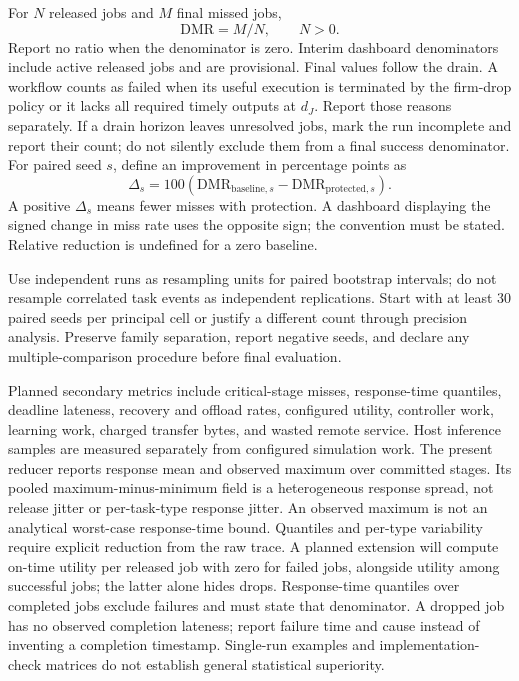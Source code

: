\documentclass[11pt,a4paper]{article}
\begin{document}
For $N$ released jobs and $M$ final missed jobs,
\begin{equation}
 \mathrm{DMR}=M/N,\qquad N>0.
\end{equation}
Report no ratio when the denominator is zero. Interim dashboard denominators
include active released jobs and are provisional. Final values follow the drain. A workflow counts as failed when its useful
execution is terminated by the firm-drop policy or it lacks all required timely
outputs at $d_J$. Report those reasons separately. If a drain horizon leaves
unresolved jobs, mark the run incomplete and report their count; do not silently
exclude them from a final success denominator.
For paired seed $s$, define an improvement in percentage points as
\begin{equation}
 \Delta_s=100(\mathrm{DMR}_{\mathrm{baseline},s}
                  -\mathrm{DMR}_{\mathrm{protected},s}).
\end{equation}
A positive $\Delta_s$ means fewer misses with protection. A dashboard displaying
the signed change in miss rate uses the opposite sign; the convention must be
stated. Relative reduction is undefined for a zero baseline.

Use independent runs as resampling units for paired bootstrap intervals; do
not resample correlated task events as independent replications. Start with at
least 30 paired seeds per principal cell or justify a different count through
precision analysis. Preserve family separation, report negative seeds, and
declare any multiple-comparison procedure before final evaluation.

Planned secondary metrics include critical-stage misses, response-time quantiles,
deadline lateness, recovery and offload rates, configured utility, controller
work, learning work, charged transfer bytes, and wasted remote service. Host
inference samples are measured separately from configured simulation work.
The present reducer reports response mean and observed maximum over committed
stages. Its pooled maximum-minus-minimum field is a heterogeneous response spread,
not release jitter or per-task-type response jitter. An observed maximum is not
an analytical worst-case response-time bound. Quantiles and per-type variability
require explicit reduction from the raw trace.
A planned extension will compute on-time utility per released job with zero
for failed jobs, alongside
utility among successful jobs; the latter alone hides drops. Response-time
quantiles over completed jobs exclude failures and must state that denominator.
A dropped job has no observed completion lateness; report failure time and cause
instead of inventing a completion timestamp.
Single-run examples and implementation-check matrices do not establish
general statistical superiority.
\end{document}
